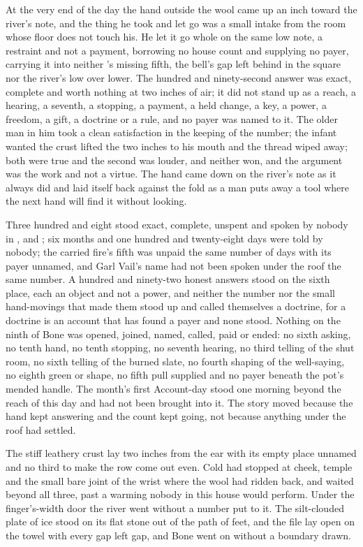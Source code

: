 At the very end of the day the hand outside the wool came up an inch toward the river's note, and the thing he took and let go was a small intake from the room whose floor does not touch his. He let it go whole on the same low note, a restraint and not a payment, borrowing no house count and supplying no payer, carrying it into neither 's missing fifth, the bell's gap left behind in the square nor the river's low over lower. The hundred and ninety-second answer was exact, complete and worth nothing at two inches of air; it did not stand up as a reach, a hearing, a seventh, a stopping, a payment, a held change, a key, a power, a freedom, a gift, a doctrine or a rule, and no payer was named to it. The older man in him took a clean satisfaction in the keeping of the number; the infant wanted the crust lifted the two inches to his mouth and the thread wiped away; both were true and the second was louder, and neither won, and the argument was the work and not a virtue. The hand came down on the river's note as it always did and laid itself back against the fold as a man puts away a tool where the next hand will find it without looking.

Three hundred and eight stood exact, complete, unspent and spoken by nobody in ,  and ; six months and one hundred and twenty-eight days were told by nobody; the carried fire's fifth was unpaid the same number of days with its payer unnamed, and Garl Vail's name had not been spoken under the roof the same number. A hundred and ninety-two honest answers stood on the sixth place, each an object and not a power, and neither the number nor the small hand-movings that made them stood up and called themselves a doctrine, for a doctrine is an account that has found a payer and none stood. Nothing on the ninth of Bone was opened, joined, named, called, paid or ended: no sixth asking, no tenth hand, no tenth stopping, no seventh hearing, no third telling of the shut room, no sixth telling of the burned slate, no fourth shaping of the well-saying, no eighth green or shape, no fifth pull supplied and no payer beneath the pot's mended handle. The month's first Account-day stood one morning beyond the reach of this day and had not been brought into it. The story moved because the hand kept answering and the count kept going, not because anything under the roof had settled.

The stiff leathery crust lay two inches from the ear with its empty place unnamed and no third to make the row come out even. Cold had stopped at cheek, temple and the small bare joint of the wrist where the wool had ridden back, and  waited beyond all three, past a warming nobody in this house would perform. Under the finger's-width door the river went  without a number put to it. The silt-clouded plate of ice stood on its flat stone out of the path of feet, and the file lay open on the towel with every gap left gap, and Bone went on without a boundary drawn.
